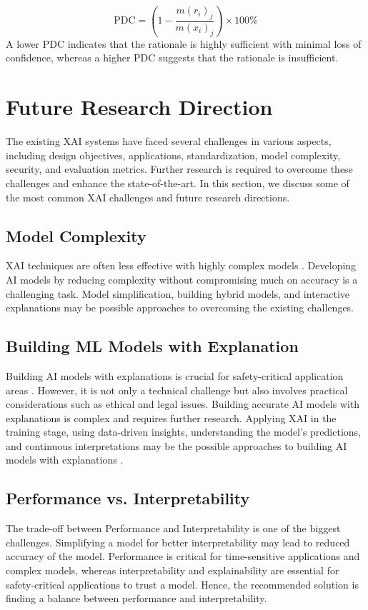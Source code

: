\documentclass[final,5p,times,twocolumn]{elsarticle}
\begin{document}
\begin{equation}
\text{PDC} = \left(1 - \frac{m(r_i)_j}{m(x_i)_j}\right) \times 100\%
\end{equation}
A lower PDC indicates that the rationale is highly sufficient with minimal loss of confidence, whereas a higher PDC suggests that the rationale is insufficient.

\section{Future Research Direction}
\label{FeatureReserechDirections}
 The existing XAI systems have faced several challenges in various aspects, including design objectives, applications, standardization, model complexity, security, and evaluation metrics. Further research is required to overcome these challenges and enhance the state-of-the-art. In this section, we discuss some of the most common XAI challenges and future research directions.


 \subsection{Model Complexity}
 XAI techniques are often less effective with highly complex models \cite{das2020opportunities}. Developing AI models by reducing complexity without compromising much on accuracy is a challenging task. Model simplification, building hybrid models, and interactive explanations may be possible approaches to overcoming the existing challenges.

\subsection{Building ML Models with Explanation }
Building AI models with explanations is crucial for safety-critical application areas \cite{thampi2022interpretable}. However, it is not only a technical challenge but also involves practical considerations such as ethical and legal issues. Building accurate AI models with explanations is complex and requires further research. Applying XAI in the training stage, using data-driven insights, understanding the model's predictions, and continuous interpretations may be the possible approaches to building AI models with explanations \cite{dwivedi2023explainable}. 

\subsection{Performance vs. Interpretability}
The trade-off between Performance and Interpretability is one of the biggest challenges. Simplifying a model for better interpretability may lead to reduced accuracy of the model. Performance is critical for time-sensitive applications and complex models, whereas interpretability and explainability are essential for safety-critical applications to trust a model. Hence, the recommended solution is finding a balance between performance and interpretability.
\end{document}
